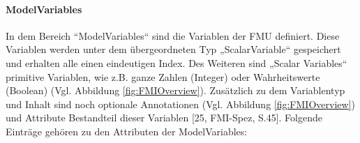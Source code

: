 \paragraph{ModelVariables}\label{sec:ModelVariables}
\noindent In dem Bereich “ModelVariables“ sind die Variablen der FMU definiert. Diese Variablen werden unter dem übergeordneten Typ „ScalarVariable“ gespeichert und erhalten alle einen eindeutigen Index. Des Weiteren sind „Scalar Variables“ primitive Variablen, wie z.B. ganze Zahlen (Integer) oder Wahrheitswerte (Boolean) (Vgl. Abbildung \ref{fig:FMIOverview}). Zusätzlich zu dem Variablentyp und Inhalt sind noch optionale Annotationen (Vgl. Abbildung \ref{fig:FMIOverview}) und Attribute Bestandteil dieser Variablen [25, FMI-Spez, S.45]. 
\newline
Folgende Einträge gehören zu den Attributen der ModelVariables:
